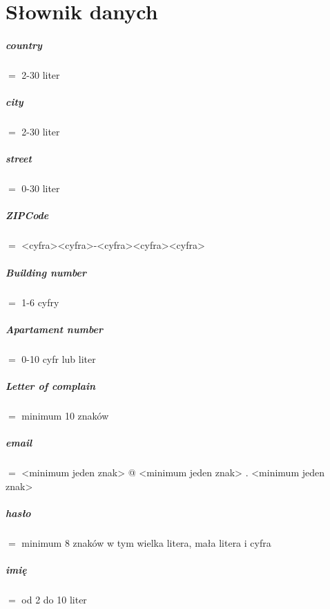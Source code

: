 \documentclass[10pt]{report}
\begin{document}

\chapter{Słownik danych}
	
		\paragraph{country} $=$ 2-30 liter
		\paragraph{city} $=$  2-30 liter
		\paragraph{street} $=$ 0-30 liter
		\paragraph{ZIPCode} $=$ <cyfra><cyfra>-<cyfra><cyfra><cyfra>
		\paragraph{Building number} $=$ 1-6 cyfry
		\paragraph{Apartament number} $=$ 0-10 cyfr lub liter
		\paragraph{Letter of complain} $=$  minimum 10 znaków
		\paragraph{email} $=$ <minimum jeden znak> @ <minimum jeden znak> .  <minimum jeden znak>
		\paragraph{hasło} $=$ minimum 8 znaków w tym wielka litera, mała litera i cyfra 
		\paragraph{imię}  $=$ od 2 do 10 liter
\end{document}
